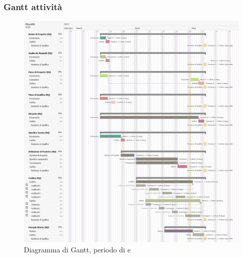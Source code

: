 \subsubsection{Gantt attività}
\begin{figure}[H]
	\centering
	\includegraphics[width=15cm]{gantt/Gantt_RQ3.png}
	\caption{Diagramma di Gantt, periodo di \PD{} e \Cod{}}
\end{figure}

